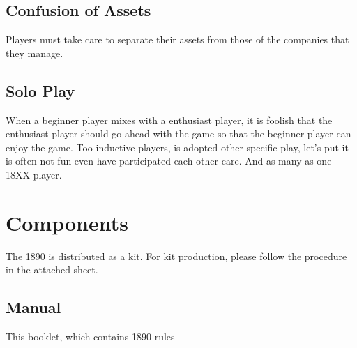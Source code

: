 \documentclass{article}
\begin{document}
\begin{CJK}{UTF8}{min}
\subsection{Confusion of Assets}
Players must take care to separate their assets from those of the
companies that they manage.



\subsection{Solo Play}

When a beginner player mixes with a enthusiast player, it is foolish
that the enthusiast player should go ahead with the game so that the
beginner player can enjoy the game. Too inductive players, is adopted
other specific play, let's put it is often not fun even have
participated each other care. And as many as one 18XX player.



\section{Components}

The 1890 is distributed as a kit. For kit production, please follow
the procedure in the attached sheet.



\subsection{Manual}

This booklet, which contains 1890 rules


\end{CJK}
\end{document}
